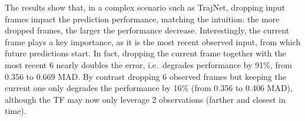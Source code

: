 \documentclass[a4paper,conference]{IEEEtran}
\begin{document}
\begin{table}[t]
\begin{center}
\small
\caption{Evaluation of missing data results for TF on TrajNet. We experiment dropping a varying number of most recent observed samples, either including or excluding the current frame. For example, in the case of dropping 3 frames, we drop  and   respectively.
}
\label{Tab:MissingNew}
\end{center}
\vspace{-0.5cm}

\end{table}
The results show that, in a complex scenario such as TrajNet, dropping input frames impact the prediction performance, matching the intuition: the more dropped frames, the larger the performance decrease. Interestingly, the current frame plays a key importance, as it is the most recent observed input, from which future predictions start. In fact, dropping the current frame together with the most recent 6 nearly doubles the error, i.e.\ degrades performance by 91\%, from 0.356 to 0.669 MAD. By contrast dropping 6 observed frames but keeping the current one only degrades the performance by 16\% (from 0.356 to 0.406 MAD), although the TF may now only leverage 2 observations (farther and closest in time).
\end{document}
